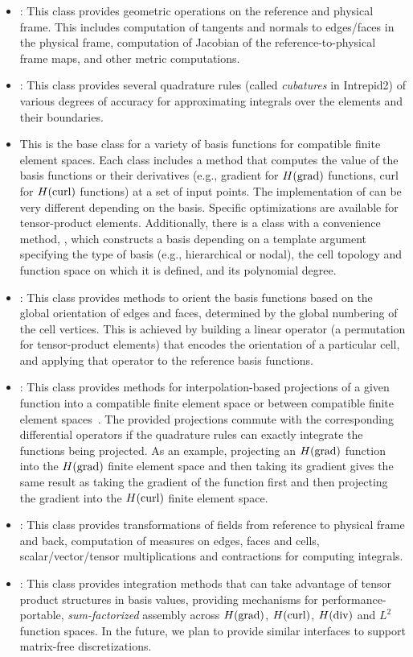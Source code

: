 \begin{itemize}
\item {}: This class provides geometric operations on the reference and physical frame. This includes computation of tangents and normals to edges/faces in the physical frame, computation of Jacobian of the reference-to-physical frame maps, and other metric computations. 
\item {}: This class provides several quadrature rules (called \emph{cubatures} in Intrepid2) of various degrees of accuracy for approximating integrals over the elements and their boundaries.
\item {} This is the base class for a variety of basis functions for compatible finite element spaces. Each class includes a  method that computes the value of the basis functions or their derivatives (e.g., gradient for $H({\rm grad})$ functions, curl for $H({\rm curl})$ functions) at a set of input points. The implementation of  can be very different depending on the basis. Specific optimizations are available for tensor-product elements.  Additionally, there is a  class with a convenience method, , which constructs a basis depending on a template argument specifying the type of basis (e.g., hierarchical or nodal), the cell topology and function space on which it is defined, and its polynomial degree.
\item {}: This class provides methods to orient the basis functions based on the global orientation of edges and faces, determined by the global numbering of the cell vertices. This is achieved by building a linear operator (a permutation for tensor-product elements) that encodes the orientation of a particular cell, and applying that operator to the reference basis functions.
\item {}: This class provides methods for interpolation-based projections of a given function into a compatible finite element space or between compatible finite element spaces~\cite{demkowicz2007}.  The provided projections commute with the corresponding differential operators if the quadrature rules can exactly integrate the functions being projected. As an example, projecting an $H({\rm grad})$ function into the $H({\rm grad})$ finite element space and then taking its gradient gives the same result as taking the gradient of the function first and then projecting the gradient into the $H({\rm curl})$ finite element space.
\item {}: This class provides transformations of fields from reference to physical frame and back, computation of measures on edges, faces and cells, scalar/vector/tensor multiplications and contractions for computing integrals.
\item {}: This class provides integration methods that can take advantage of tensor product structures in basis values, providing mechanisms for performance-portable, \emph{sum-factorized} assembly across $H({\rm grad})$, $H({\rm curl})$, $H({\rm div})$ and $L^2$ function spaces.  In the future, we plan to provide similar interfaces to support matrix-free discretizations.
\end{itemize}
